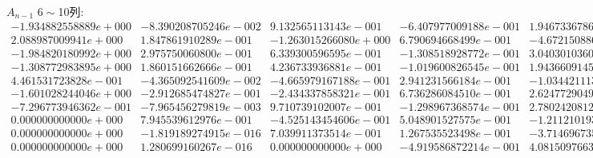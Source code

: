 \begin{landscape}
$A_{n-1}$
$6\sim$10列:
\[
\begin{matrix}
-1.934882558889e+000 & -8.390208705246e-002 & 9.132565113143e-001 & -6.407977009188e-001 & 1.946733678685e-001\\2.088987009941e+000 & 1.847861910289e-001 & -1.263015266080e+000 & 6.790694668499e-001 & -4.672150886500e-001\\-1.984820180992e+000 & 2.975750060800e-001 & 6.339300596595e-001 & -1.308518928772e-001 & 3.040301036095e-001\\-1.308772983895e+000 & 1.860151662666e-001 & 4.236733936881e-001 & -1.019600826545e-001 & 1.943660914505e-001\\4.461531723828e-001 & -4.365092541609e-002 & -4.665979167188e-001 & 2.941231566184e-001 & -1.034421113665e-001\\-1.601028244046e+000 & -2.912685474827e-001 & -2.434337858321e-001 & 6.736286084510e-001 & 2.624772904937e-001\\-7.296773946362e-001 & -7.965456279819e-003 & 9.710739102007e-001 & -1.298967368574e-001 & 2.780242081241e-002\\0.000000000000e+000 & 7.945539612976e-001 & -4.525143454606e-001 & 5.048901527575e-001 & -1.211210193512e-001\\0.000000000000e+000 & -1.819189274915e-016 & 7.039911373514e-001 & 1.267535523498e-001 & -3.714696735513e-001\\0.000000000000e+000 & 1.280699160267e-016 & 0.000000000000e+000 & -4.919586872214e-001 & 4.081509766399e-001\\
\end{matrix}\]



\end{landscape}
